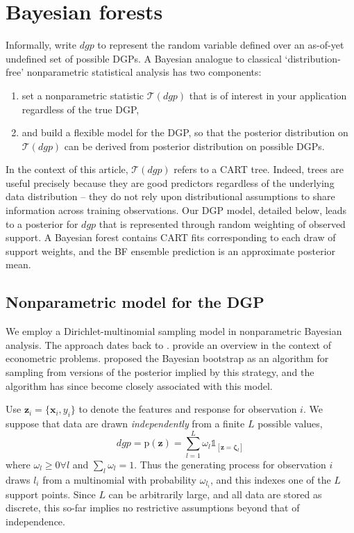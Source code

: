\documentclass{article}
\begin{document}
\section{Bayesian forests}\label{bayesian-forests}

Informally, write $dgp$ to represent the random variable defined over an as-of-yet undefined set of possible DGPs.
A Bayesian analogue to classical `distribution-free' nonparametric
statistical analysis \citep[e.g.,][]{hollander_nonparametric_1999} has two components:
\begin{enumerate}
\item set a nonparametric statistic $\mathcal{T}(dgp)$ that is of interest in your application regardless of the true DGP,
\item and build a flexible model for the DGP, so that the posterior distribution on $\mathcal{T}(dgp)$ can be derived from  posterior distribution on possible DGPs.
\end{enumerate}
In  the context of this article, $\mathcal{T}(dgp)$ refers to a CART tree.   Indeed, trees are useful precisely because they are good predictors regardless of the underlying data distribution -- they do not rely upon distributional assumptions to share information across training observations. 
Our DGP model, detailed below, leads to a posterior for $dgp$ that is represented through random weighting of observed support.  A Bayesian forest contains CART fits corresponding to each draw of support weights, and the BF ensemble prediction is an approximate posterior mean.

\subsection{Nonparametric model for the DGP}\label{dgpmodel}

We employ a Dirichlet-multinomial sampling model in nonparametric
Bayesian analysis. The approach dates back to
\citet{ferguson_bayesian_1973}. \citet{chamberlain_nonparametric_2003}
provide an overview in the context of econometric problems.
\citet{rubin_bayesian_1981} proposed the Bayesian bootstrap as an
algorithm for sampling from versions of the posterior implied by this
strategy, and the algorithm has since become closely associated with
this model.

Use $\mathbf{z}_i = \{\mathbf{x}_i,y_i\}$ to denote the  features
and response  for observation $i$. We suppose that data are drawn
\emph{independently} from a finite  $L$  possible values,
\begin{equation}\label{dgpeq}
dgp = \mathrm{p}(\mathbf{z}) = \sum_{l=1}^L \omega_l \mathds{1}_{[\mathbf{z} = \boldsymbol{\zeta}_l]}
\end{equation}
where $\omega_l\geq0\forall l$ and $\sum_l \omega_l = 1$. Thus the
generating process for observation $i$ draws $l_i$ from a multinomial
with probability $\omega_{l_i}$, and this indexes one of the $L$ support
points. Since $L$ can be arbitrarily large, and all data are stored as
discrete, this so-far implies no restrictive
assumptions beyond that of independence.
\end{document}

